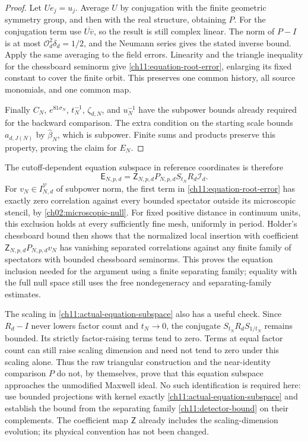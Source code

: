 \begin{proof}
Let $Ue_j=u_j$. Average $U$ by conjugation with the finite geometric
symmetry group, and then with the real structure, obtaining $P$.
For the conjugation term use $\overline{U\overline v}$, so the result
is still complex linear. The norm of $P-I$ is at most
$\mathcal O_d^2\delta_d=1/2$, and the Neumann series gives the stated
inverse bound. Apply the same averaging to the field errors.
Linearity and the triangle inequality for the chessboard seminorm give \eqref{ch11:equation-root-error}, enlarging its fixed
constant to cover the finite orbit. This preserves one common
history, all source monomials, and one common map.

Finally $C_N$, $e^{81\sigma_N}$, $t_N^{-1}$,
$\zeta_{d,N}$, and $u_N^{-1}$ have the subpower bounds already
required for the backward comparison. The extra condition on the starting scale bounds
$a_{d,J(N)}$ by $\widehat\beta_N$, which is subpower.
Finite sums and products preserve this property, proving the claim
for $E_N$.
\end{proof}

The cutoff-dependent equation subspace in reference coordinates is therefore
\begin{equation}
 \mathsf E_{N,p,d}
   =\mathsf Z_{N,p,d}P_{N,p,d}
               S_{t_N}R_d\mathcal I_d.
 \label{ch11:actual-equation-subspace}
\end{equation}
For $v_N\in I_{N,d}^{\mathcal V}$ of subpower norm, the first term
in \eqref{ch11:equation-root-error} has exactly zero correlation
against every bounded spectator outside its microscopic stencil,
by \eqref{ch02:microscopic-null}. For fixed positive distance in continuum
units, this exclusion holds at every sufficiently fine mesh,
uniformly in period. Holder's chessboard bound then shows that the
normalized local insertion with coefficient
$\mathsf Z_{N,p,d}P_{N,p,d}v_N$ has vanishing separated correlations
against any finite family of spectators with bounded chessboard seminorms. This proves the equation inclusion needed for the
argument using a finite separating family; equality with the full null space still
uses the free nondegeneracy and separating-family estimates.

The scaling in \eqref{ch11:actual-equation-subspace} also has a
useful check. Since $R_d-I$ never lowers factor count and $t_N\to0$,
the conjugate $S_{t_N}R_dS_{1/t_N}$ remains bounded.
Its strictly factor-raising terms tend to zero. Terms at equal
factor count can still raise scaling dimension and need not tend
to zero under this scaling alone. Thus the raw triangular
construction and the near-identity comparison $P$ do not, by
themselves, prove that this equation subspace approaches the
unmodified Maxwell ideal. No such identification is required here: use bounded projections
with kernel exactly \eqref{ch11:actual-equation-subspace} and establish
the bound from the separating family \eqref{ch11:detector-bound} on their complements.
The coefficient map $\mathsf Z$ already includes the scaling-dimension
evolution; its physical convention has not been changed.
